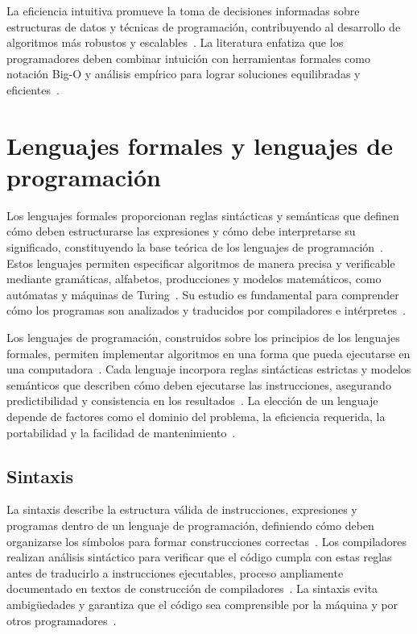 \documentclass[12pt,twoside]{book}
\begin{document}
						La eficiencia intuitiva promueve la toma de decisiones informadas sobre estructuras de datos y técnicas de programación, contribuyendo al desarrollo de algoritmos más robustos y escalables~\cite{Sommerville2015Software}. La literatura enfatiza que los programadores deben combinar intuición con herramientas formales como notación Big-O y análisis empírico para lograr soluciones equilibradas y eficientes~\cite{Stallings2021Computer}.
	
			\section{Lenguajes formales y lenguajes de programación}
				Los lenguajes formales proporcionan reglas sintácticas y semánticas que definen cómo deben estructurarse las expresiones y cómo debe interpretarse su significado, constituyendo la base teórica de los lenguajes de programación~\cite{Tanenbaum2021Structured}. Estos lenguajes permiten especificar algoritmos de manera precisa y verificable mediante gramáticas, alfabetos, producciones y modelos matemáticos, como autómatas y máquinas de Turing~\cite{Sommerville2015Software}. Su estudio es fundamental para comprender cómo los programas son analizados y traducidos por compiladores e intérpretes~\cite{Stallings2021Computer}.
				
				Los lenguajes de programación, construidos sobre los principios de los lenguajes formales, permiten implementar algoritmos en una forma que pueda ejecutarse en una computadora~\cite{Gaddis2022Starting}. Cada lenguaje incorpora reglas sintácticas estrictas y modelos semánticos que describen cómo deben ejecutarse las instrucciones, asegurando predictibilidad y consistencia en los resultados~\cite{Pressman2019Software}. La elección de un lenguaje depende de factores como el dominio del problema, la eficiencia requerida, la portabilidad y la facilidad de mantenimiento~\cite{Sommerville2015Software}.
				
				\subsection{Sintaxis}
					La sintaxis describe la estructura válida de instrucciones, expresiones y programas dentro de un lenguaje de programación, definiendo cómo deben organizarse los símbolos para formar construcciones correctas~\cite{Tanenbaum2021Structured}. Los compiladores realizan análisis sintáctico para verificar que el código cumpla con estas reglas antes de traducirlo a instrucciones ejecutables, proceso ampliamente documentado en textos de construcción de compiladores~\cite{Stallings2021Computer}. La sintaxis evita ambigüedades y garantiza que el código sea comprensible por la máquina y por otros programadores~\cite{Gaddis2022Starting}.
					
\end{document}
